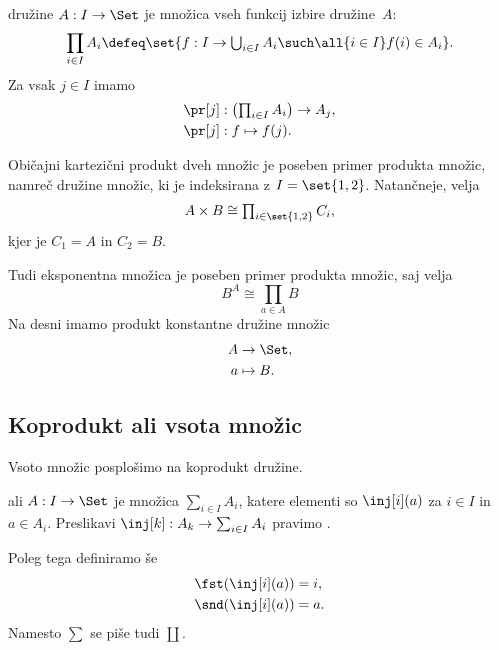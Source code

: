  \begin{definicija}
    družine $A : I \to \Set$ je množica vseh funkcij izbire družine~$A$:
   \begin{equation*}
     \prod_{i \in I} A_i \defeq
     \set{f : I \to \textstyle\bigcup_{i \in I} A_i \such \all{i \in I} f(i) \in A_i}.
   \end{equation*}
   Za vsak $j \in I$ imamo 
   \begin{align*}
    \pr[j] &:  \left(\textstyle\prod_{i \in I} A_i\right) \to A_j, \\
    \pr[j] &:  f \mapsto f(j).
   \end{align*}
 \end{definicija}

Običajni kartezični produkt dveh množic je poseben primer produkta množic, namreč družine
množic, ki je indeksirana z $I = \set{1, 2}$. Natančneje, velja
%
\begin{equation*}
  A \times B \cong \textstyle\prod_{i \in \set{1, 2}} C_i,
\end{equation*}
%
kjer je $C_1 = A$ in $C_2 = B$.

Tudi eksponentna množica je poseben primer produkta množic, saj velja
%
\begin{equation*}
  B^A \cong \textstyle\prod_{a \in A} B
\end{equation*}
%
Na desni imamo produkt konstantne družine množic
\begin{align*}
  A &\to \Set, \\
  a &\mapsto B.
\end{align*}


\subsection{Koprodukt ali vsota množic}

Vsoto množic posplošimo na koprodukt družine.

\begin{definicija}
   ali  $A : I \to \Set$ je množica
  $\sum_{i \in I} A_i$, katere elementi so $\inj[i](a)$ za $i \in I$ in $a \in A_i$.
  Preslikavi $\inj[k] : A_k \to \sum_{i \in I} A_i$ pravimo .

  Poleg tega definiramo še 
  \begin{align*}
    \fst (\inj[i](a)) &= i, \\
    \snd (\inj[i](a)) &= a.
  \end{align*}
  Namesto $\sum$ se piše tudi $\coprod$.
\end{definicija}

